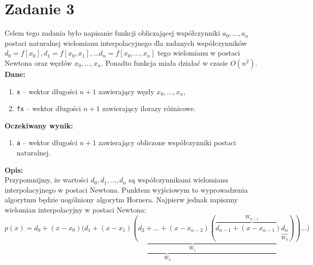 \documentclass[]{article}
\begin{document}
	

	\section*{Zadanie 3} 
	
	Celem tego zadania było napisanie funkcji obliczającej współczynniki $a_0,\ldots,a_n$ postaci naturalnej wielomianu interpolacyjnego dla zadanych współczynników $d_0 = f[x_0], d_1 = f[x_0,x_1], \ldots d_n = f[x_0, \ldots, x_n]$ tego wielomianu w postaci Newtona oraz węzłów $x_0, \ldots, x_n$. Ponadto funkcja miała działać w czasie $O(n^2)$.\\
	\textbf{Dane:}
	\begin{enumerate}[]
		\item \texttt{x} -- wektor długości $n+1$ zawierający węzły $x_0, \ldots, x_n$,
		\item \texttt{fx} -- wektor długości $n+1$ zawierający ilorazy różnicowe.
	\end{enumerate}
	\textbf{Oczekiwany wynik:}
	\begin{enumerate}[]
		\item \texttt{a} -- wektor długości $n+1$ zawierający obliczone współczynniki postaci naturalnej.
	\end{enumerate}
	\textbf{Opis:}\\
	Przypomnijmy, że wartości $d_0, d_1, \ldots, d_n$ są współczynnikami wielomianu interpolacyjnego w postaci Newtona. Punktem wyjściowym to wyprowadzenia algorytmu będzie uogólniony algorytm Hornera. Najpierw jednak zapiszmy wielomian interpolacyjny w postaci Newtona: 
	$$ p(x) = \underbrace{d_0 + (x-x_0)(\underbrace{d_1 + (x-x_1)
	(d_2 + \ldots + (x-x_{n-2})(\overbrace{d_{n-1}+(x-x_{n-1})\underbrace{d_n}_{W_n}}^{W_{n-1}}))}_{W_1}}_{W_0}\ldots)$$
\end{document}
